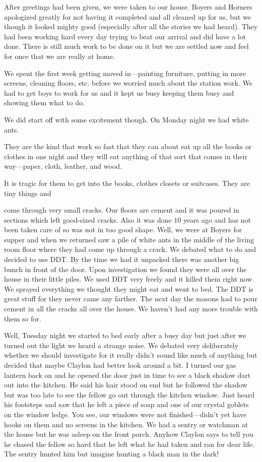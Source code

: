 \documentclass[
]{book}
\begin{document}
After greetings had been given, we were taken to our house. Boyers and Horners apologized greatly for not having it completed and all cleaned up for us, but we though it looked mighty good (especially after all the stories we had heard). They had been working hard every day trying to beat our arrival and did have a lot done. There is still much work to be done on it but we are settled now and feel for once that we are really at home.

We spent the first week getting moved in---painting furniture, putting in more screens, cleaning floors, etc. before we worried much about the station work. We had to get boys to work for us and it kept us busy keeping them busy and showing them what to do.

We did start off with some excitement though. On Monday night we had white ants.

They are the kind that work so fast that they can about eat up all the books or clothes in one night and they will eat anything of that sort that comes in their way---paper, cloth, leather, and wood.

It is tragic for them to get into the books, clothes closets or suitcases. They are tiny things and

come through very small cracks. Our floors are cement and it was poured in sections which left good-sized cracks. Also it was done 10 years ago and has not been taken care of so was not in too good shape. Well, we were at Boyers for supper and when we returned saw a pile of white ants in the middle of the living room floor where they had come up through a crack. We debated what to do and decided to use DDT. By the time we had it unpacked there was another big bunch in front of the door. Upon investigation we found they were all over the house in their little piles. We used DDT very freely and it killed them right now. We sprayed everything we thought they might eat and went to bed. The DDT is great stuff for they never came any farther. The next day the masons had to pour cement in all the cracks all over the house. We haven't had any more trouble with them so for.

Well, Tuesday night we started to bed early after a busy day but just after we turned out the light we heard a strange noise. We debated very deliberately whether we should investigate for it really didn't sound like much of anything but decided that maybe Claylon had better look around a bit. I turned our gas lantern back on and he opened the door just in time to see a black shadow dart out into the kitchen. He said his hair stood on end but he followed the shadow but was too late to see the fellow go out through the kitchen window. Just heard his footsteps and saw that he left a piece of soap and one of our crystal goblets on the window ledge. You see, our windows were not finished---didn't yet have hooks on them and no screens in the kitchen. We had a sentry or watchman at the house but he was asleep on the front porch. Anyhow Claylon says to tell you he chased the fellow so hard that he left what he had taken and ran for dear life. The sentry hunted him but imagine hunting a black man in the dark!
\end{document}
